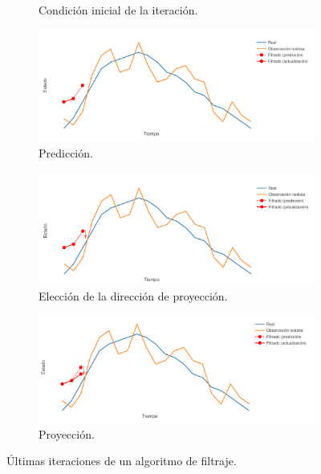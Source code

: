 \begin{itemize}
\begin{figure}[h!]
\begin{subfigure}[b]{.49\linewidth}
            \caption{Condición inicial de la iteración.}
        \end{subfigure}
        \begin{subfigure}[b]{.49\linewidth}
        \centering
            \includegraphics[width=\linewidth]{img/content/chapter2/filt5.pdf}
            \caption{Predicción.}
        \end{subfigure}
        \begin{subfigure}[b]{.49\linewidth}
        \centering
            \includegraphics[width=\linewidth]{img/content/chapter2/filt6.pdf}
            \caption{Elección de la dirección de proyección.}
        \end{subfigure}
        \begin{subfigure}[b]{.49\linewidth}
        \centering
            \includegraphics[width=\linewidth]{img/content/chapter2/filt7.pdf}
            \caption{Proyección.}
        \end{subfigure}
        \caption{Últimas iteraciones de un algoritmo de filtraje.}

\end{figure}
\end{itemize}
